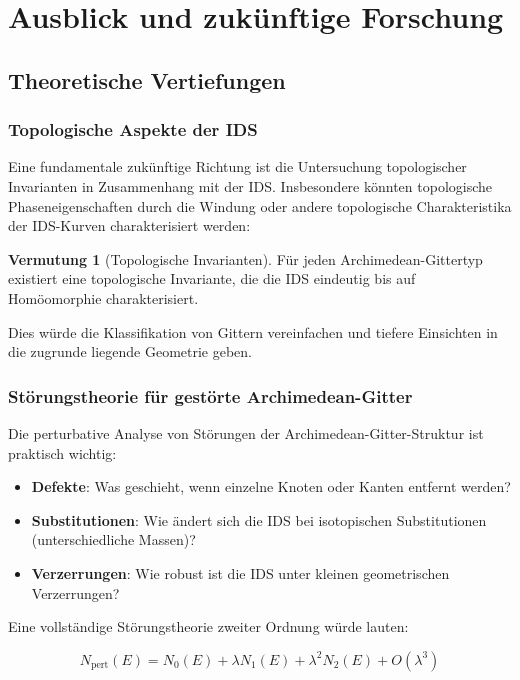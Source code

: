 \documentclass[a4paper,12pt]{article}
\theoremstyle{definition}
\newtheorem{vermutung}{Vermutung}[section]
\begin{document}
\section{Ausblick und zukünftige Forschung}

\subsection{Theoretische Vertiefungen}

\subsubsection{Topologische Aspekte der IDS}

Eine fundamentale zukünftige Richtung ist die Untersuchung topologischer Invarianten in Zusammenhang mit der IDS. Insbesondere könnten topologische Phaseneigenschaften durch die Windung oder andere topologische Charakteristika der IDS-Kurven charakterisiert werden:

\begin{vermutung}[Topologische Invarianten]
	Für jeden Archimedean-Gittertyp existiert eine topologische Invariante, die die IDS eindeutig bis auf Homöomorphie charakterisiert.
\end{vermutung}

Dies würde die Klassifikation von Gittern vereinfachen und tiefere Einsichten in die zugrunde liegende Geometrie geben.

\subsubsection{Störungstheorie für gestörte Archimedean-Gitter}

Die perturbative Analyse von Störungen der Archimedean-Gitter-Struktur ist praktisch wichtig:

\begin{itemize}
	\item \textbf{Defekte}: Was geschieht, wenn einzelne Knoten oder Kanten entfernt werden?
	\item \textbf{Substitutionen}: Wie ändert sich die IDS bei isotopischen Substitutionen (unterschiedliche Massen)?
	\item \textbf{Verzerrungen}: Wie robust ist die IDS unter kleinen geometrischen Verzerrungen?
\end{itemize}

Eine vollständige Störungstheorie zweiter Ordnung würde lauten:

\[
N_{\text{pert}}(E) = N_{\text{0}}(E) + \lambda N_{\text{1}}(E) + \lambda^2 N_{\text{2}}(E) + O(\lambda^3)
\]
\end{document}
